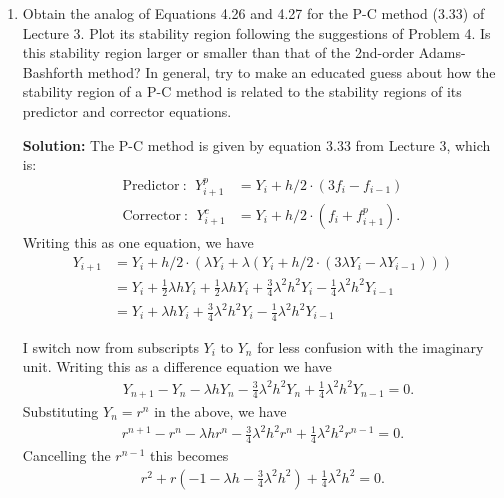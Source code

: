 \documentclass[11pt]{article}
\def\f{\frac }
\begin{document}
\begin{enumerate}

\clearpage
\newpage
\item Obtain the analog of Equations 4.26 and 4.27 for the P-C method (3.33) of Lecture 3.
Plot its stability region following the suggestions of Problem 4.
Is this stability region larger or smaller than that of the 2nd-order Adams-Bashforth method?
In general, try to make an educated guess about how the stability region of a P-C method is related to the stability regions of its predictor and corrector equations.

\textbf{Solution:} The P-C method is given by equation 3.33 from Lecture 3, which is:
\begin{align} \text{Predictor}~:~~ Y_{i+1} ^p & = Y_i + h/2 \cdot ( 3f_i - f_{i-1} ) \\
\text{Corrector}~:~~ Y_{i+1} ^c & = Y_i + h/2 \cdot ( f_i + f^p_{i+1} ) .\end{align}
Writing this as one equation, we have
\begin{align} Y_{i+1} &= Y_i + h/2 \cdot \left( \lambda Y_i + \lambda \left ( Y_i + h/2 \cdot (3 \lambda Y_i - \lambda Y_{i-1}) \right ) \right ) \\
 &= Y_i + \f{1}{2} \lambda h Y_i + \frac{1}{2} \lambda h Y_i + \frac{3}{4} \lambda ^2 h^2 Y_i - \frac{1}{4} \lambda ^2 h^2 Y_{i-1} \\
 &= Y_i + \lambda h Y_i + \frac{3}{4} \lambda ^2 h^2 Y_i - \frac{1}{4} \lambda ^2 h^2 Y_{i-1} \end{align}

I switch now from subscripts $Y_i$ to $Y_n$ for less confusion with the imaginary unit.
Writing this as a difference equation we have
\begin{align} & Y_{n+1} - Y_n - \lambda h Y_n - \frac{3}{4} \lambda ^2 h^2 Y_n + \frac{1}{4} \lambda ^2 h^2 Y_{n-1}  = 0.\end{align}
Substituting $Y_n = r^n$ in the above, we have
\begin{align} r^{n+1} - r^n - \lambda h r^n - \frac{3}{4} \lambda ^2 h^2 r^n + \frac{1}{4} \lambda ^2 h^2 r^{n-1}   = 0.\end{align}
Cancelling the $r^{n-1}$ this becomes
\begin{align} r^2 + r \left ( -1 - \lambda h - \frac{3}{4} \lambda ^2 h^2 \right ) + \frac{1}{4} \lambda ^2 h^2 = 0.\end{align}


\end{enumerate}
\end{document}
